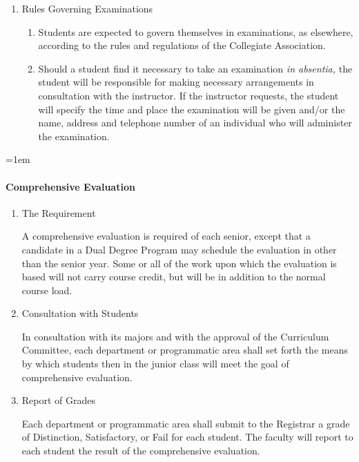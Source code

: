 \documentclass{manual}
\newcommand{\oldbreak}[1]{}
\let\oldparagraph\paragraph
\renewcommand\paragraph{\leftskip=1em\oldparagraph}
\newcommand{\itemLevelA}{\alph*.}
\newcommand{\itemLevelB}{\arabic*)}
\newcommand{\itemRefA}{\alph*}
\newcommand{\itemRefB}{\arabic*}
\begin{document}
\begin{enumerate}[label=\alph*]
\oldbreak{VII-6}

\item Rules Governing Examinations

\begin{enumerate}[label=\itemLevelB,ref=\itemRefB]
\item Students are expected to govern themselves in examinations, as elsewhere, according to the rules and regulations of the Collegiate Association.
\item Should a student find it necessary to take an examination \textit{in absentia, }the student will be responsible for making necessary arrangements in consultation with the instructor. If the instructor requests, the student will specify the time and place the examination will be given and/or the name, address and telephone number of an individual who will administer the examination.
\end{enumerate}
\end{enumerate}

\paragraph{Comprehensive Evaluation}

\begin{enumerate}[label=\itemLevelA,ref=\itemRefA]
\item The Requirement

A comprehensive evaluation is required of each senior, except that a candidate in a Dual Degree Program may schedule the evaluation in other than the senior year. Some or all of the work upon which the evaluation is based will not carry course credit, but will be in addition to the normal course load.
\item Consultation with Students

In consultation with its  majors and with the approval of the Curriculum Committee, each department or programmatic area shall  set forth the means by which students then in the junior class will meet the goal of comprehensive evaluation.

\item Report of Grades

Each department or programmatic area shall submit to the Registrar a grade of Distinction, Satisfactory, or Fail for each student. The faculty will report to each student the result of the comprehensive evaluation.

\end{enumerate}
\end{document}
